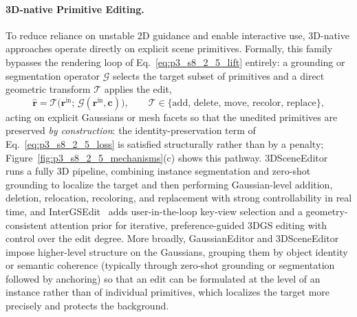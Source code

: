 \paragraph{3D-native Primitive Editing.}
To reduce reliance on unstable 2D guidance and enable interactive use, 3D-native approaches operate directly on explicit scene primitives.
Formally, this family bypasses the rendering loop of Eq.~\eqref{eq:p3_s8_2_5_lift} entirely: a grounding or segmentation operator $\mathcal{G}$ selects the target subset of primitives and a direct geometric transform $\mathcal{T}$ applies the edit,
\begin{equation}
\hat{\mathbf{r}} = \mathcal{T}\!\big(\mathbf{r}^{\text{in}};\,\mathcal{G}(\mathbf{r}^{\text{in}},\mathbf{c})\big), \qquad \mathcal{T}\in\{\text{add},\,\text{delete},\,\text{move},\,\text{recolor},\,\text{replace}\},
\label{eq:p3_s8_2_5_native}
\end{equation}
acting on explicit Gaussians or mesh facets so that the unedited primitives are preserved \emph{by construction}: the identity-preservation term of Eq.~\eqref{eq:p3_s8_2_5_loss} is satisfied structurally rather than by a penalty; Figure~\ref{fig:p3_s8_2_5_mechanisms}(c) shows this pathway.
3DSceneEditor~\cite{yan20243dsceneeditor} runs a fully 3D pipeline, combining instance segmentation and zero-shot grounding to localize the target and then performing Gaussian-level addition, deletion, relocation, recoloring, and replacement with strong controllability in real time, and InterGSEdit~\cite{wen2025intergsedit} adds user-in-the-loop key-view selection and a geometry-consistent attention prior for iterative, preference-guided 3DGS editing with control over the edit degree.
More broadly, GaussianEditor and 3DSceneEditor~\cite{chen2024gaussianeditor,yan20243dsceneeditor} impose higher-level structure on the Gaussians, grouping them by object identity or semantic coherence (typically through zero-shot grounding or segmentation~\cite{hu2024semanticanythinggaussians,cen2025segmentany3dgaussians} followed by anchoring) so that an edit can be formulated at the level of an instance rather than of individual primitives, which localizes the target more precisely and protects the background.

